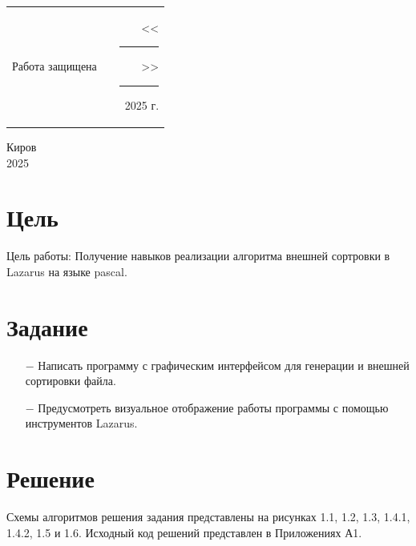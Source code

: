 \documentclass[oneside,a4paper,14pt]{extarticle}
\begin{document}
\noindent
\begin{tabular}{lp{58mm}r}
	Работа защищена &  & <<\rule[-1mm]{5mm}{0.10mm}\/>>\rule[-1mm]{30mm}{0.10mm}\ 2025 г.
\end{tabular}
\vfill

\begin{center}
	Киров\\
	2025
\end{center}

\newpage\thispagestyle{plain}

\section*{Цель}

Цель работы: Получение навыков реализации алгоритма внешней сортровки в Lazarus на языке pascal.

\section*{Задание}
\begin{itemize}
	\item[$-$] Написать программу с графическим интерфейсом для генерации и внешней сортировки файла.
  \item[$-$] Предусмотреть визуальное отображение работы программы с помощью инструментов Lazarus.
\end{itemize}

\section*{Решение}

Схемы алгоритмов решения задания представлены на рисунках 1.1, 1.2, 1.3, 1.4.1, 1.4.2, 1.5 и 1.6. Исходный код решений представлен в Приложениях А1.
\end{document}
